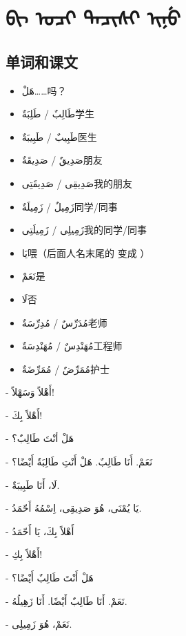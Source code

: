 \chapter{\textmongolian{ᠪᡳ ᠣᠴᡳ ᡨᠠᠴᡳᠰᡳ ᡳᠨᡠ}}

\section{ 单词和课文}

\begin{itemize}
    \item \ac{هَلْ}{……吗？}
    \item \ac{طَالِبٌ / طَلِبَةٌ}{学生}
    \item \ac{طَبِيبٌ / طَبِيبَةٌ}{医生}
    \item \ac{صَدِيقٌ / صَدِيقَةٌ}{朋友}
    \item \ac{صَدِيقِى / صَدِيقَتِى}{我的朋友}
    \item \ac{زَمِيلٌ / زَمِيلَةٌ}{同学/同事}
    \item \ac{زَمِيلِى / زَمِيلَتِى}{我的同学/同事}
    \item \ac{يَا}{喂（后面人名末尾的  变成 ）}
    \item \ac{نَعَمْ}{是}
    \item \ac{لَا}{否}
    \item \ac{مُدَرِّسٌ / مُدِرِّسَةٌ}{老师}
    \item \ac{مُهَنْدِسٌ / مُهَنْدِسَةٌ}{工程师}
    \item \ac{مُمَرِّضٌ / مُمَرِّضَةٌ}{护士}
\end{itemize}

\begin{Arabic}
    - أَهْلاً وَسَهْلاً!

    - أَهْلاً بِكَ!

    - هَلْ أنْتَ طَالِبٌ؟

    - نَعَمْ. أَنَا طَالِبٌ. هَلْ أَنْتِ طَالِبَةٌ أَيْضًا؟

    - لَا، أَنَا طَبِيبَةٌ.

    - يَا يُمْنَى، هُوَ صَدِيقِى، اِسْمُهُ أَحّمَدُ.

    - أَهْلاً بِكَ، يَا أَحّمَدُ

    - أَهْلاً بِكِ!

    - هَلْ أَنْتَ طَالِبٌ أَيْضًا؟

    - نَعَمْ. أَنَا طَالِبٌ أَيْضًا. أَنَا زَهِيلُهُ.

    - نَعَمْ، هُوَ زَمِيلِى.
\end{Arabic}

